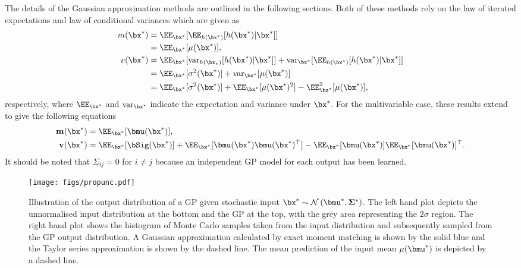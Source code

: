 The details of the Gaussian approximation methods are outlined in the following sections. Both of these methods rely on the law of iterated expectations and law of conditional variances which are given as
\begin{align}
m(\bx^*) &= \EE_{\bx^*}[\EE_{h(\bx^*)}  [h(\bx^*)|\bx^*]  ] \\
\nonumber&= \EE_{\bx^*}[\mu(\bx^*)], \\
v(\bx^*)  &= \EE_{\bx^*}[\mathrm{var}_{h(\bx_*)}[h(\bx^*)|\bx^*]] + \mathrm{var}_{\bx^*} [\EE_{h(\bx^*)}  [h(\bx^*)|\bx^*]]  \\
\nonumber&=  \EE_{\bx^*}[\sigma^2(\bx^*)]  +  \mathrm{var}_{\bx^*}[\mu(\bx^*)] \\
\nonumber&=  \EE_{\bx^*}[\sigma^2(\bx^*)]  +  \EE_{\bx^*}[\mu(\bx^*)^2]  - \EE^2_{\bx^*}[\mu(\bx^*)],
\end{align}
respectively, where $\EE_{\bx^*}$ and $\mathrm{var}_{\bx^*}$ indicate the expectation and variance under $\bx^*$. For the multivariable case, these results extend to give the following equations
\begin{align}
\mathbf{m}(\bx^*) &= \EE_{\bx^*}[\bmu(\bx^*)], \\
\mathbf{v}(\bx^*)  &=  \EE_{\bx^*}[\bSig(\bx^*)]  +
\EE_{\bx^*}[\bmu(\bx^*)\bmu(\bx^*)^\top]  - 
\EE_{\bx^*}[\bmu(\bx^*)]\EE_{\bx^*}[\bmu(\bx^*)]^\top.
\end{align}
It should be noted that $\Sigma_{ij}=0$ for $i \neq j$ because an independent GP model for each output has been learned.



\begin{figure}[t]
\centering
\texttt{[image: figs/propunc.pdf]}
\caption{\small Illustration of the output distribution of a GP given stochastic input $\bx^* \sim \mathcal{N}\left(\bmu^*,\mathbf{\Sigma}^* \right)$. The left hand plot depicts the unnormalised input distribution at the bottom and the GP at the top, with the grey area representing the $2\sigma$ region. The right hand plot shows the histogram of Monte Carlo samples taken from the input distribution and subsequently sampled from the GP output distribution. A Gaussian approximation calculated by exact moment matching is shown by the solid blue and the Taylor series approximation is shown by the dashed line. The mean prediction of the input mean $\mu(\bmu^*)$ is depicted by a dashed line.}
\label{COOLfig}
\end{figure}



